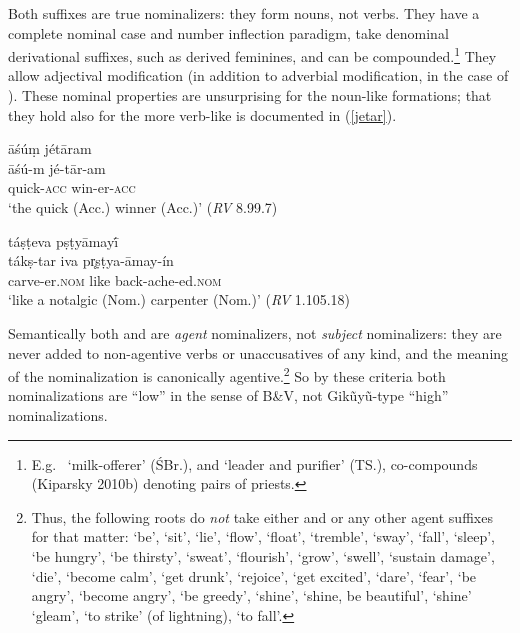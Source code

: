\documentclass[output=paper,
modfonts
]{LSP/langsci}
\newcommand{\rf}[1]{(\ref{#1})}
\def\urf#1{$^{\textrm{\scriptsize{#1}}}$}
\begin{document}
Both suffixes are true nominalizers: they form nouns, not verbs.  They have a complete nominal
case and number inflection paradigm, take denominal derivational suffixes, such as derived
feminines, and can be compounded.\footnote{E.g.\  `milk-offerer' (ŚBr.),
  and   `leader and purifier' (TS.), co-compounds
  (Kiparsky 2010b) denoting  pairs of priests.}  They allow adjectival modification (in
addition to adverbial modification, in the case of \form{′-tar-\urf{V}}).  These nominal
properties are unsurprising for the noun-like \form{-tár-\urf{N}} formations; that they hold
also for the more verb-like \form{′-tar-\urf{V}} is documented in \rf{jetar}.
\begin{exe}
\ex\label{jetar}
 	\ea \glll āśúṃ  jétāram\\
	āśú-m  jé-tār-am\\
	quick-\textsc{acc} win-er-\textsc{acc}\\
	\glt `the quick (Acc.) winner (Acc.)' \hfill (\textit{RV} 8.99.7) 

	\ex \glll táṣṭeva {} pṣṭyāmayī́\\
   	tákṣ-tar iva  {pr̥ṣṭya-āmay-ín}\\
	 carve-er.\textsc{nom} like back-ache-ed.\textsc{nom}\\
	\glt `like a notalgic (Nom.) carpenter (Nom.)' \hfill (\textit{RV} 1.105.18)
	\z
\end{exe}

Semantically both \form{-tár-\urf{N}} and \form{′-tar-\urf{V}} are \textit{agent}
nominalizers, not \textit{subject} nominalizers: they are never added to non-agentive verbs or
unaccusatives of any kind, and the meaning of the nominalization is canonically
agentive.\footnote{Thus, the following roots do \textit{not} take either \form{-tár-\urf{N}}
  and \form{′-tar-\urf{V}} or any other agent suffixes for that matter:  `be',
   `sit',  `lie',  `flow',  `float',
   `tremble',  `sway',  `fall', 
  `sleep',  `be hungry',  `be thirsty',  `sweat',
   `flourish',  `grow',  `swell', 
  `sustain damage',  `die',  `become calm',  `get drunk',
   `rejoice',  `get excited',  `dare', 
  `fear',  `be angry',  `become angry',  `be greedy',
   `shine',  `shine, be beautiful',  `shine' 
  `gleam',  `to strike' (of lightning),  `to fall'.} So by these
criteria both nominalizations are ``low'' in the sense of B\&V, not Gikũyũ-type ``high''
nominalizations.
\end{document}
